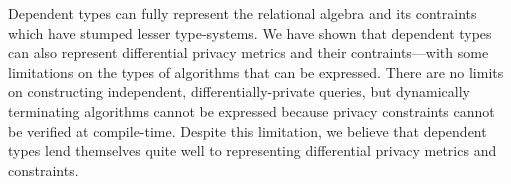 \documentclass[12pt]{report}
\begin{document}
Dependent types can fully represent the relational algebra and its contraints which have stumped lesser type-systems\cite{OurySwierstra08PowerOfPi}.
We have shown that dependent types can also represent differential privacy metrics and their contraints---with some limitations on the types of algorithms that can be expressed.
There are no limits on constructing independent, differentially-private queries, but dynamically terminating algorithms cannot be expressed because privacy constraints cannot be verified at compile-time.
Despite this limitation, we believe that dependent types lend themselves quite well to representing differential privacy metrics and constraints.



\end{document}
